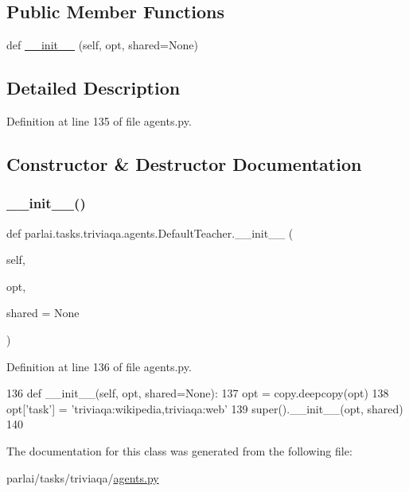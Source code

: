 \subsection*{Public Member Functions}
\begin{DoxyCompactItemize}
\item 
def \hyperlink{classparlai_1_1tasks_1_1triviaqa_1_1agents_1_1DefaultTeacher_aab891504cebc2c749a658d8102d8fbce}{\+\_\+\+\_\+init\+\_\+\+\_\+} (self, opt, shared=None)
\end{DoxyCompactItemize}


\subsection{Detailed Description}


Definition at line 135 of file agents.\+py.



\subsection{Constructor \& Destructor Documentation}
\mbox{\label{classparlai_1_1tasks_1_1triviaqa_1_1agents_1_1DefaultTeacher_aab891504cebc2c749a658d8102d8fbce}} 
\subsubsection{\texorpdfstring{\+\_\+\+\_\+init\+\_\+\+\_\+()}{\_\_init\_\_()}}
{\footnotesize\ttfamily def parlai.\+tasks.\+triviaqa.\+agents.\+Default\+Teacher.\+\_\+\+\_\+init\+\_\+\+\_\+ (\begin{DoxyParamCaption}\item[{}]{self,  }\item[{}]{opt,  }\item[{}]{shared = {\ttfamily None} }\end{DoxyParamCaption})}



Definition at line 136 of file agents.\+py.


\begin{DoxyCode}
136     \textcolor{keyword}{def }\_\_init\_\_(self, opt, shared=None):
137         opt = copy.deepcopy(opt)
138         opt[\textcolor{stringliteral}{'task'}] = \textcolor{stringliteral}{'triviaqa:wikipedia,triviaqa:web'}
139         super().\_\_init\_\_(opt, shared)
140 \end{DoxyCode}


The documentation for this class was generated from the following file\+:\begin{DoxyCompactItemize}
\item 
parlai/tasks/triviaqa/\hyperlink{parlai_2tasks_2triviaqa_2agents_8py}{agents.\+py}\end{DoxyCompactItemize}
